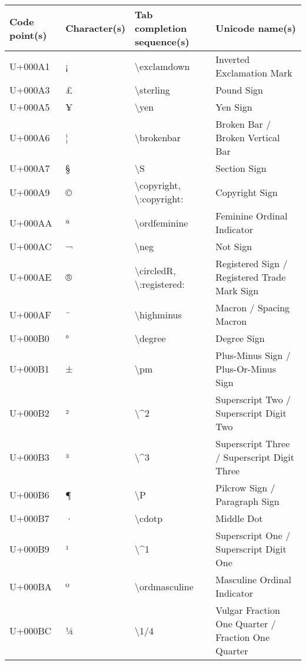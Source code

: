 
\begin{table}[h]

\begin{tabulary}{\linewidth}{|L|L|L|L|}
\hline
Code point(s) & Character(s) & Tab completion sequence(s) & Unicode name(s) \\
\hline
U+000A1 & ¡ & {\textbackslash}exclamdown & Inverted Exclamation Mark \\
\hline
U+000A3 & £ & {\textbackslash}sterling & Pound Sign \\
\hline
U+000A5 & ¥ & {\textbackslash}yen & Yen Sign \\
\hline
U+000A6 & ¦ & {\textbackslash}brokenbar & Broken Bar / Broken Vertical Bar \\
\hline
U+000A7 & § & {\textbackslash}S & Section Sign \\
\hline
U+000A9 & © & {\textbackslash}copyright, {\textbackslash}:copyright: & Copyright Sign \\
\hline
U+000AA & ª & {\textbackslash}ordfeminine & Feminine Ordinal Indicator \\
\hline
U+000AC & ¬ & {\textbackslash}neg & Not Sign \\
\hline
U+000AE & ® & {\textbackslash}circledR, {\textbackslash}:registered: & Registered Sign / Registered Trade Mark Sign \\
\hline
U+000AF & ¯ & {\textbackslash}highminus & Macron / Spacing Macron \\
\hline
U+000B0 & ° & {\textbackslash}degree & Degree Sign \\
\hline
U+000B1 & ± & {\textbackslash}pm & Plus-Minus Sign / Plus-Or-Minus Sign \\
\hline
U+000B2 & ² & {\textbackslash}{\textasciicircum}2 & Superscript Two / Superscript Digit Two \\
\hline
U+000B3 & ³ & {\textbackslash}{\textasciicircum}3 & Superscript Three / Superscript Digit Three \\
\hline
U+000B6 & ¶ & {\textbackslash}P & Pilcrow Sign / Paragraph Sign \\
\hline
U+000B7 & · & {\textbackslash}cdotp & Middle Dot \\
\hline
U+000B9 & ¹ & {\textbackslash}{\textasciicircum}1 & Superscript One / Superscript Digit One \\
\hline
U+000BA & º & {\textbackslash}ordmasculine & Masculine Ordinal Indicator \\
\hline
U+000BC & ¼ & {\textbackslash}1/4 & Vulgar Fraction One Quarter / Fraction One Quarter \\

\end{tabulary}
\end{table}
